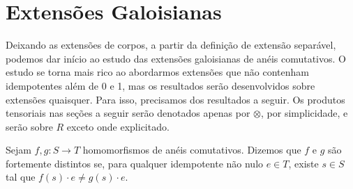 \section{Extensões Galoisianas} \label{sec:extgal}
Deixando as extensões de corpos, a partir da definição de extensão separável, podemos dar início ao estudo das extensões galoisianas de anéis comutativos. O estudo se torna mais rico ao abordarmos extensões que não contenham idempotentes além de 0 e 1, mas os resultados serão desenvolvidos sobre extensões quaisquer. Para isso, precisamos dos resultados a seguir. Os produtos tensoriais nas seções a seguir serão denotados apenas por $\otimes$, por simplicidade, e serão sobre $R$ exceto onde explicitado.
\begin{defn}
Sejam $f,g:S\rightarrow T$ homomorfismos de anéis comutativos. Dizemos que $f$ e $g$ são fortemente distintos se, para qualquer idempotente não nulo $e \in T$, existe $s \in S$ tal que $f(s)\cdot e \neq g(s) \cdot e$.
\end{defn}

